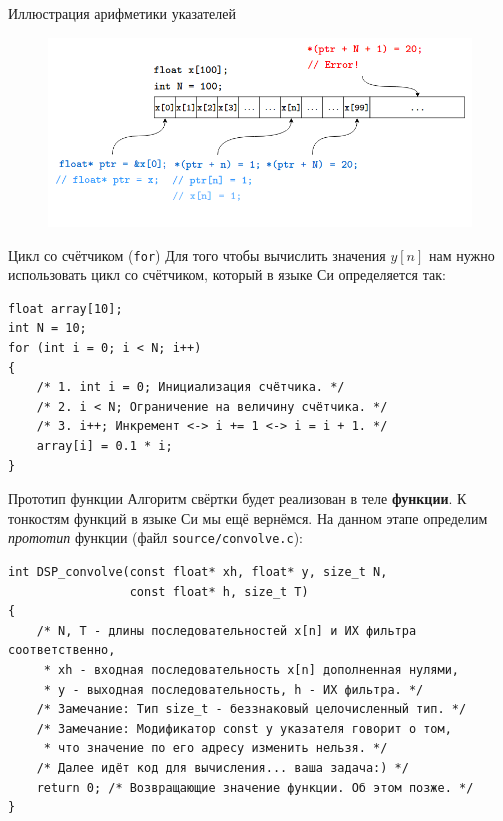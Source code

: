\documentclass{beamer}
\begin{document}
    \begin{frame}{Иллюстрация арифметики указателей}
        \begin{figure}[!tbp]
               \centering
               \includegraphics[width=\textwidth]{pics/ptrs.png}
               \captionsetup{justification=centering}
        \end{figure}
    \end{frame}
    \begin{frame}[fragile]{Цикл со счётчиком (\texttt{for})}
        \justifying
        Для того чтобы вычислить значения $y[n]$ нам нужно использовать цикл со счётчиком, который в языке Си определяется так:
        \begin{verbatim}
float array[10];
int N = 10;
for (int i = 0; i < N; i++)
{
    /* 1. int i = 0; Инициализация счётчика. */
    /* 2. i < N; Ограничение на величину счётчика. */
    /* 3. i++; Инкремент <-> i += 1 <-> i = i + 1. */
    array[i] = 0.1 * i;
}
        \end{verbatim}
    \end{frame}
    \begin{frame}[fragile]{Прототип функции}
        \justifying
        Алгоритм свёртки будет реализован в теле {\bf функции}. К тонкостям функций в языке Си мы ещё вернёмся. На данном этапе определим {\it прототип} функции (файл {\tt source/convolve.c}):
        \begin{verbatim}
int DSP_convolve(const float* xh, float* y, size_t N, 
                 const float* h, size_t T)
{
    /* N, T - длины последовательностей x[n] и ИХ фильтра соответственно,
     * xh - входная последовательность x[n] дополненная нулями,
     * y - выходная последовательность, h - ИХ фильтра. */
    /* Замечание: Тип size_t - беззнаковый целочисленный тип. */
    /* Замечание: Модификатор const у указателя говорит о том, 
     * что значение по его адресу изменить нельзя. */
    /* Далее идёт код для вычисления... ваша задача:) */
    return 0; /* Возвращающие значение функции. Об этом позже. */
}
        \end{verbatim}
    \end{frame}
\end{document}
